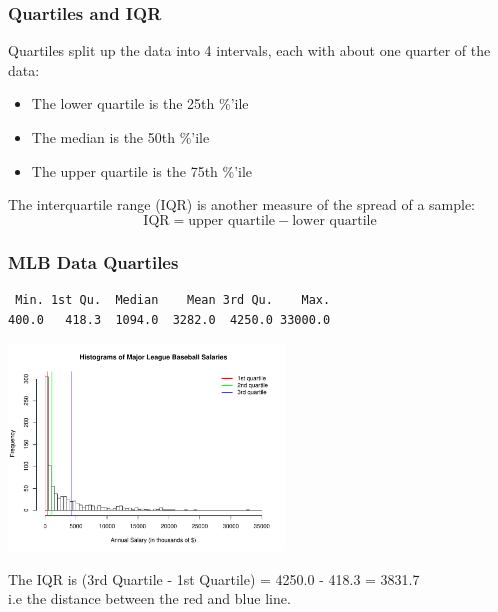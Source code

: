 \documentclass[handout]{beamer}
\newcommand{\blue}[1]{\textcolor{blue2}{#1}}
\begin{document}
\begin{frame}
\frametitle{Quartiles and IQR}

%
%
\blue{Quartiles} split up the data into 4 intervals, each with about one quarter of the data:

\vspace{0.25cm}

\begin{itemize}
\pause \item The lower quartile is the 25th \%'ile
\pause \item The median is the 50th \%'ile
\pause \item The upper quartile is the 75th \%'ile
\end{itemize}

\vspace{0.25cm}

\pause The \blue{interquartile range (IQR)} is another measure of the spread of a sample:
\[
\mbox{IQR} = \mbox{upper quartile} - \mbox{lower quartile}
\]

\end{frame}


\begin{frame}[fragile]
\frametitle{MLB Data Quartiles}

\begin{verbatim}
 Min. 1st Qu.  Median    Mean 3rd Qu.    Max.
400.0   418.3  1094.0  3282.0  4250.0 33000.0
\end{verbatim}

\begin{center}
\includegraphics[height=5.5cm]{figure/MLB_quartiles.pdf}
\end{center}

The IQR is (3rd Quartile - 1st Quartile) = 4250.0 - 418.3 = 3831.7\\
i.e the distance between the red and blue line.  

\end{frame}
\end{document}
